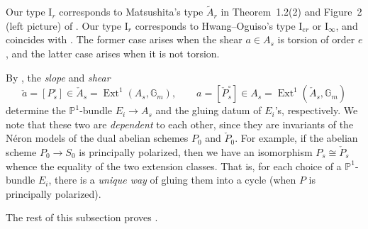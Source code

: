 \documentclass[reqno, letterpaper]{amsart}
\numberwithin{equation}{subsection}
\let\to\longrightarrow
\newcommand{\GG}{\mathbb{G}}
\newcommand{\PP}{\mathbb{P}}
\DeclareMathOperator{\Ext}{Ext}
\begin{document}
		\begin{remark}
			Our type $\mathrm I_r$ corresponds to Matsushita's type $\tilde A_r$ in Theorem~1.2(2) and Figure~2 (left picture) of \cite{mat01}. Our type $\mathrm I_r$ corresponds to Hwang--Oguiso's \cite{hwang-ogu09} type $\mathrm I_{er}$ or $\mathrm I_{\infty}$, and coincides with \cite[\S 6.2]{EFGMS25}. The former case arises when the shear $a \in A_s$ is torsion of order $e$, and the latter case arises when it is not torsion.
		\end{remark}
		
		\begin{remark} \label{rmk:classification of semistable fibers}
			By , the \emph{slope} and \emph{shear}
			\[ \check a = [P_s^\circ] \in \check A_s = \Ext^1 (A_s, \GG_m) ,\qquad a = [\check P_s^\circ] \in A_s = \Ext^1 (\check A_s, \GG_m) \]
			determine the $\PP^1$-bundle $E_i \to A_s$ and the gluing datum of $E_i$'s, respectively. We note that these two are \emph{dependent} to each other, since they are invariants of the N\'eron models of the dual abelian schemes $P_0$ and $\check P_0$. For example, if the abelian scheme $P_0 \to S_0$ is principally polarized, then we have an isomorphism $P_s \cong \check P_s$ whence the equality of the two extension classes. That is, for each choice of a $\PP^1$-bundle $E_i$, there is a \emph{unique way} of gluing them into a cycle (when $P$ is principally polarized).
		\end{remark}
		
		The rest of this subsection proves .
		
\end{document}
